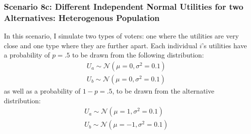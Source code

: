 \documentclass[12pt]{article}\usepackage[]{graphicx}\usepackage[]{color}
\newenvironment{knitrout}{}{} %
\begin{document}
\begin{knitrout}
\end{knitrout}


\clearpage
\subsubsection*{Scenario 8c: Different Independent Normal Utilities for two Alternatives: Heterogenous Population}
In this scenario, I simulate two types of voters: one where the utilities are very close and one type where they are further apart. Each individual $i$'s utilities have a probability of $p=.5$ to be drawn from the following distribution:
\begin{align*}
U_a \sim \mathcal{N}(\mu=0,\sigma^2=0.1)\\
U_b \sim \mathcal{N}(\mu=0,\sigma^2=0.1)
\end{align*}
as well as a probability of $1-p=.5$, to be drawn from the alternative distribution:
\begin{align*}
U_a \sim \mathcal{N}(\mu=1,\sigma^2=0.1)\\
U_b \sim \mathcal{N}(\mu=-1,\sigma^2=0.1)
\end{align*}
\end{document}
